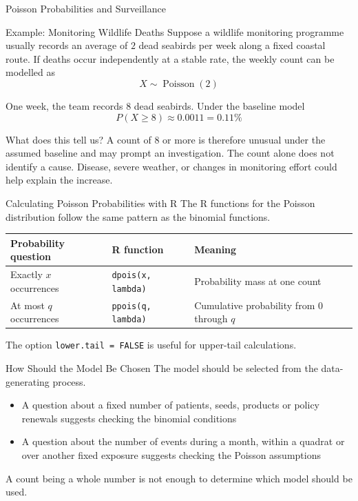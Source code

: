 \documentclass[aspectratio=169]{beamer}
\begin{document}
\begin{frame}{Poisson Probabilities and Surveillance}
\begin{block}{Example: Monitoring Wildlife Deaths}
Suppose a wildlife monitoring programme usually records an average of $2$ dead seabirds per week along a fixed coastal route. If deaths occur independently at a stable rate, the weekly count can be modelled as
$$X\sim\operatorname{Poisson}(2)$$

One week, the team records $8$ dead seabirds. Under the baseline model
$$P(X\geq8)\approx0.0011=0.11\%$$
\end{block}

\begin{alertblock}{What does this tell us?}
A count of $8$ or more is therefore unusual under the assumed baseline and may prompt an investigation. The count alone does not identify a cause. Disease, severe weather, or changes in monitoring effort could help explain the increase.
\end{alertblock}
\end{frame}

\begin{frame}{Calculating Poisson Probabilities with R}
The R functions for the Poisson distribution follow the same pattern as the binomial functions.

\begin{table}
\centering
\small
\begin{tabularx}{\textwidth}{>{\RaggedRight\arraybackslash}p{} >{\RaggedRight\arraybackslash}p{} X}
\toprule
Probability question & R function & Meaning \\
\midrule
Exactly $x$ occurrences & \texttt{dpois(x, lambda)} & Probability mass at one count \\
At most $q$ occurrences & \texttt{ppois(q, lambda)} & Cumulative probability from 0 through $q$ \\
\bottomrule
\end{tabularx}
\end{table}

The option \texttt{lower.tail = FALSE} is useful for upper-tail calculations.
\end{frame}

\begin{frame}{How Should the Model Be Chosen}
The model should be selected from the data-generating process.
\begin{itemize}
	\item A question about a fixed number of patients, seeds, products or policy renewals suggests checking the binomial conditions
  	\item A question about the number of events during a month, within a quadrat or over another fixed exposure suggests checking the Poisson assumptions
\end{itemize}
A count being a whole number is not enough to determine which model should be used.
\end{frame}
\end{document}

